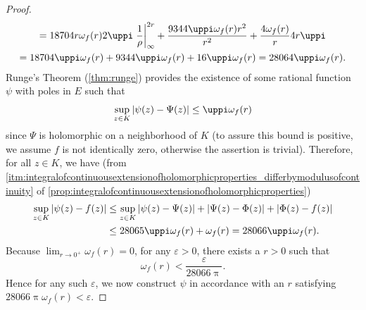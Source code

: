 \begin{proof}
\begin{multline*}
        =18704r\omega_f(r)2\uppi\eval{\frac{1}{\rho}}_{\infty}^{2r}+\frac{9344\uppi\omega_f(r)r^2}{r^2}+\frac{4\omega_f(r)}{r}4r\uppi\\
        =18704\uppi\omega_f(r)+9344\uppi\omega_f(r)+16\uppi\omega_f(r)=28064\uppi\omega_f(r).
    \end{multline*}
    Runge's Theorem (\cref{thm:runge}) provides the existence of some rational function \(\psi\) with poles in \(E\) such that \[\sup_{z\in K}\abs{\psi(z)-\Psi(z)}\leq\uppi\omega_f(r)\] since \(\Psi\) is holomorphic on a neighborhood of \(K\) (to assure this bound is positive, we assume \(f\) is not identically zero, otherwise the assertion is trivial). Therefore, for all \(z\in K\), we have (from \cref{itm:integralofcontinuousextensionofholomorphicproperties_differbymodulusofcontinuity} of \cref{prop:integralofcontinuousextensionofholomorphicproperties})
    \begin{align*}
        \sup_{z\in K}\abs{\psi(z)-f(z)}&\leq\sup_{z\in K}\abs{\psi(z)-\Psi(z)}+\abs{\Psi(z)-\Phi(z)}+\abs{\Phi(z)-f(z)}\\
        &\leq 28065\uppi\omega_f(r) + \omega_f(r)=28066\uppi\omega_f(r).
    \end{align*} Because \(\lim_{r\to0^+}\omega_f(r)=0\), for any \(\varepsilon>0\), there exists a \(r>0\) such that \[\omega_f(r)<\frac{\varepsilon}{28066\uppi}.\]
    Hence for any such \(\varepsilon\), we now construct \(\psi\) in accordance with an \(r\) satisfying \(28066\uppi\omega_f(r)<\varepsilon\).
\end{proof}
